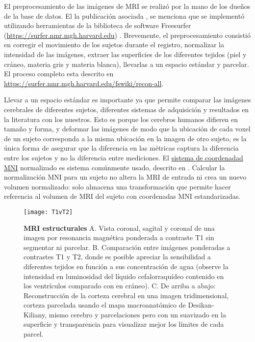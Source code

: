 \documentclass[11pt,letterpaper]{article}
\numberwithin{equation}{subsection}
\numberwithin{table}{subsection}
\begin{document}
\bigskip
\noindent El preprocesamiento de las imágenes de MRI se realizó por la mano de los dueños de la base de datos. El la publicación asociada \cite{shafto2014cambridge}, se menciona que se implementó utilizando herramientas de la biblioteca de software Freesurfer (\url{https://surfer.nmr.mgh.harvard.edu}) \cite{fischl2012freesurfer}. Brevemente, el preprocesamiento consistió en corregir el movimiento de los sujetos durante el registro, normalizar la intensidad de las imágenes, extraer las superficies de los diferentes tejidos (piel y cráneo, materia gris y materia blanca), llevarlas a un espacio estándar y parcelar. El proceso completo esta descrito en \url{https://surfer.nmr.mgh.harvard.edu/fswiki/recon-all}.

\bigskip
\noindent Llevar a un espacio estándar es importante ya que permite comparar las imágenes cerebrales de diferentes sujetos, diferentes sistemas de adquisición y resultados en la literatura con los nuestros. Esto es porque los cerebros humanos difieren en tamaño y forma, y deformar las imágenes de modo que la ubicación de cada voxel de un sujeto corresponda a la misma ubicación en la imagen de otro sujeto, es la única forma de asegurar que la diferencia en las métricas captura la diferencia entre los sujetos y no la diferencia entre mediciones. El \href {https://www.bic.mni.mcgill.ca/~louis/stx_history.html}{sistema de coordenadad MNI} normalizado es sistema comúnmente usado, descrito en \cite{ashburner2005unified}. Calcular la normalización MNI para un sujeto no altera la MRI de entrada ni crea un nuevo volumen normalizado: solo almacena una transformación que permite hacer referencia al volumen de MRI del sujeto con coordenadas MNI estandarizadas. 


\begin{figure}[H]
\centering
	\texttt{[image: T1vT2]}
	\captionsetup{labelfont=bf}
	\caption{\scriptsize \textbf{MRI estructurales} A. Vista coronal, sagital y coronal de una imagen por resonancia magnética ponderada a contraste T1 sin segmentar ni parcelar. B. Comparación entre imágenes ponderadas a contrastes T1 y T2, donde es posible apreciar la sensibilidad a diferentes tejidos en función a sus concentración de agua (observe la intensidad en luminosidad del líquido cefalorraquídeo contenido en los ventrículos comparado con en cráneo). C. De arriba a abajo: Reconstrucción de la corteza cerebral en una imagen tridimensional, corteza parcelada usando el mapa macroanatómico de Desikan-Kiliany, mismo cerebro y parcelaciones pero con un suavizado en la superficie y transparencia para visualizar mejor los límites de cada parcel.}
	\label{fig:Fig12}
\end{figure}
\end{document}

